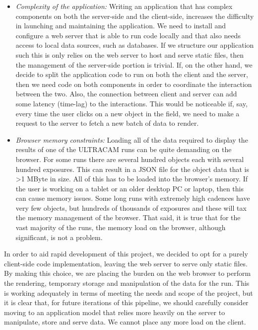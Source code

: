 \begin{itemize}
  \item \emph{Complexity of the application:} Writing an application that has complex components on both the server-side and the client-side, increases the difficulty in launching and maintaining the application. We need to install and configure a web server that is able to run code locally and that also needs access to local data sources, such as databases. If we structure our application such this is only relies on the web server to host and serve static files, then the management of the server-side portion is trivial. If, on the other hand, we decide to split the application code to run on both the client and the server, then we need code on both components in order to coordinate the interaction between the two. Also, the connection between client and server can add some latency (time-lag) to the interactions. This would be noticeable if, say, every time the user clicks on a new object in the field, we need to make a request to the server to fetch a new batch of data to render.  

  \item \emph{Browser memory constraints:} Loading all of the data required to display the results of one of the ULTRACAM runs can be quite demanding on the browser. For some runs there are several hundred objects each with several hundred exposures. This can result in a JSON file for the object data that is \textgreater 1 MByte in size. All of this has to be loaded into the browser's memory. If the user is working on a tablet or an older desktop PC or laptop, then this can cause memory issues. Some long runs with extremely high cadences have very few objects, but hundreds of thousands of exposures and these will tax the memory management of the browser. That said, it is true that for the vast majority of the runs, the memory load on the browser, although significant, is not a problem. 
\end{itemize}

In order to aid rapid development of this project, we decided to opt for a purely client-side code implementation, leaving the web server to serve only static files. By making this choice, we are placing the burden on the web browser to perform the rendering, temporary storage and manipulation of the data for the run. This is working adequately in terms of meeting the needs and scope of the project, but it is clear that, for future iterations of this pipeline, we should carefully consider moving to an application model that relies more heavily on the server to manipulate, store and serve data. We cannot place any more load on the client. 

